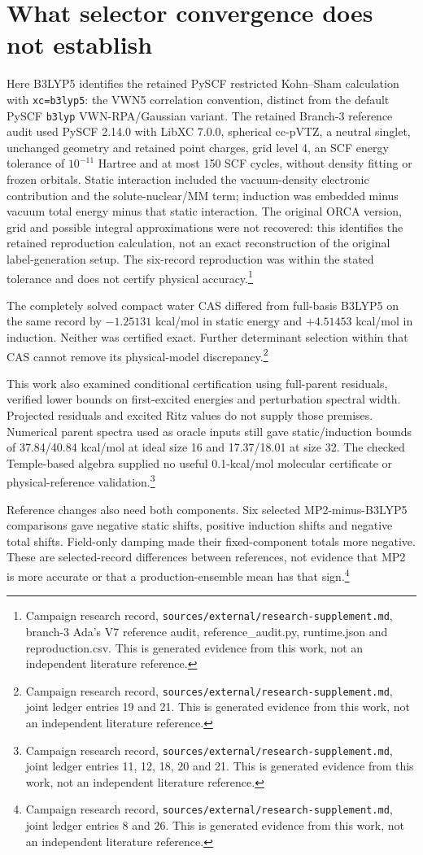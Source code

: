 \documentclass{article}
\newcommand{\record}[1]{\footnote{Campaign research record, \texttt{sources/external/research-supplement.md}, #1. This is generated evidence from this work, not an independent literature reference.}}
\begin{document}
\section{What selector convergence does not establish}
Here B3LYP5 identifies the retained PySCF restricted Kohn--Sham calculation with \texttt{xc=b3lyp5}: the VWN5 correlation convention, distinct from the default PySCF \texttt{b3lyp} VWN-RPA/Gaussian variant. The retained Branch-3 reference audit used PySCF 2.14.0 with LibXC 7.0.0, spherical cc-pVTZ, a neutral singlet, unchanged geometry and retained point charges, grid level 4, an SCF energy tolerance of \(10^{-11}\) Hartree and at most 150 SCF cycles, without density fitting or frozen orbitals. Static interaction included the vacuum-density electronic contribution and the solute-nuclear/MM term; induction was embedded minus vacuum total energy minus that static interaction. The original ORCA version, grid and possible integral approximations were not recovered: this identifies the retained reproduction calculation, not an exact reconstruction of the original label-generation setup. The six-record reproduction was within the stated tolerance and does not certify physical accuracy.\record{branch-3 Ada's V7 reference audit, reference\_audit.py, runtime.json and reproduction.csv}

The completely solved compact water CAS differed from full-basis B3LYP5 on the same record by \(-1.25131\) kcal/mol in static energy and \(+4.51453\) kcal/mol in induction. Neither was certified exact. Further determinant selection within that CAS cannot remove its physical-model discrepancy.\record{joint ledger entries 19 and 21}

This work also examined conditional certification using full-parent residuals, verified lower bounds on first-excited energies and perturbation spectral width. Projected residuals and excited Ritz values do not supply those premises. Numerical parent spectra used as oracle inputs still gave static/induction bounds of 37.84/40.84 kcal/mol at ideal size 16 and 17.37/18.01 at size 32. The checked Temple-based algebra supplied no useful 0.1-kcal/mol molecular certificate or physical-reference validation.\record{joint ledger entries 11, 12, 18, 20 and 21}

Reference changes also need both components. Six selected MP2-minus-B3LYP5 comparisons gave negative static shifts, positive induction shifts and negative total shifts. Field-only damping made their fixed-component totals more negative. These are selected-record differences between references, not evidence that MP2 is more accurate or that a production-ensemble mean has that sign.\record{joint ledger entries 8 and 26}
\end{document}
